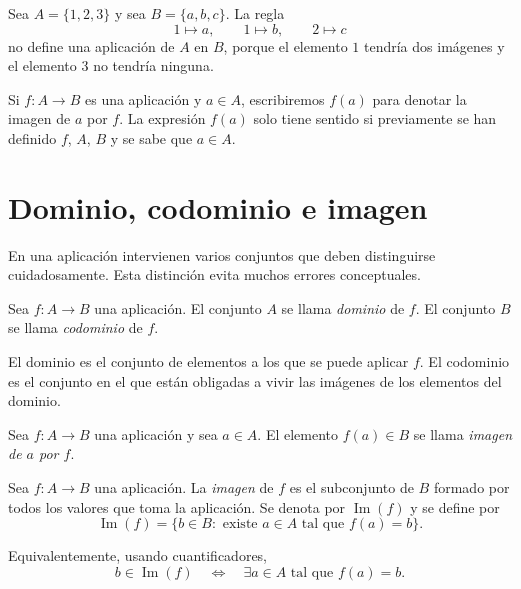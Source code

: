 \begin{contraejemplo}
Sea \(A=\{1,2,3\}\) y sea \(B=\{a,b,c\}\). La regla
\[
1\mapsto a,\qquad 1\mapsto b,\qquad 2\mapsto c
\]
no define una aplicación de \(A\) en \(B\), porque el elemento \(1\) tendría dos imágenes y el elemento \(3\) no tendría ninguna.
\end{contraejemplo}

\begin{convencion}
Si \(f:A\to B\) es una aplicación y \(a\in A\), escribiremos \(f(a)\) para denotar la imagen de \(a\) por \(f\). La expresión \(f(a)\) solo tiene sentido si previamente se han definido \(f\), \(A\), \(B\) y se sabe que \(a\in A\).
\end{convencion}

\section{Dominio, codominio e imagen}

En una aplicación intervienen varios conjuntos que deben distinguirse cuidadosamente. Esta distinción evita muchos errores conceptuales.

\begin{definicion}
Sea \(f:A\to B\) una aplicación. El conjunto \(A\) se llama \emph{dominio} de \(f\). El conjunto \(B\) se llama \emph{codominio} de \(f\).
\end{definicion}

El dominio es el conjunto de elementos a los que se puede aplicar \(f\). El codominio es el conjunto en el que están obligadas a vivir las imágenes de los elementos del dominio.

\begin{definicion}
Sea \(f:A\to B\) una aplicación y sea \(a\in A\). El elemento \(f(a)\in B\) se llama \emph{imagen de \(a\) por \(f\)}.
\end{definicion}

\begin{definicion}
Sea \(f:A\to B\) una aplicación. La \emph{imagen} de \(f\) es el subconjunto de \(B\) formado por todos los valores que toma la aplicación. Se denota por \(\operatorname{Im}(f)\) y se define por
\[
\operatorname{Im}(f)=\{b\in B:\text{ existe }a\in A\text{ tal que }f(a)=b\}.
\]
\end{definicion}

Equivalentemente, usando cuantificadores,
\[
b\in \operatorname{Im}(f) \quad \Longleftrightarrow \quad \exists a\in A \text{ tal que } f(a)=b.
\]

